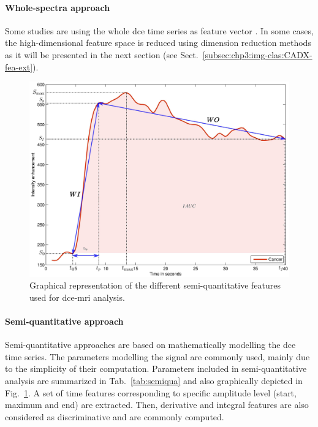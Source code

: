 \paragraph{Whole-spectra approach}
Some studies are using the whole \ac{dce} time series as feature vector \cite{Ampeliotis2007,Ampeliotis2008,Tiwari2012,Viswanath2008a,Viswanath2008}.
In some cases, the high-dimensional feature space is reduced using dimension reduction methods as it will be presented in the next section (see Sect.~\ref{subsec:chp3:img-clas:CADX-fea-ext}).

\begin{figure}
	\centering
	\includegraphics[width=.8\linewidth]{3_review/figures/feature-detection/dce/dce_cancer_parameters.eps}
	\caption[Semi-quantitative features used for \acs*{dce}-\acs*{mri}.]{Graphical representation of the different semi-quantitative features used for \acs*{dce}-\acs*{mri} analysis.}
	\label{fig:dceparam}
\end{figure}

\paragraph{Semi-quantitative approach}
Semi-quantitative approaches are based on mathematically modelling the \ac{dce} time series.
The parameters modelling the signal are commonly used, mainly due to the simplicity of their computation.
Parameters included in semi-quantitative analysis are summarized in Tab.~\ref{tab:semiqua} and also graphically depicted in Fig.~\ref{fig:dceparam}.
A set of time features corresponding to specific amplitude level (start, maximum and end) are extracted.
Then, derivative and integral features are also considered as discriminative and are commonly computed.



